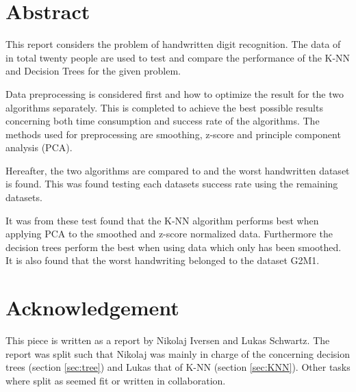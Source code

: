 \section*{Abstract}
This report considers the problem of handwritten digit recognition.
The data of in total twenty people are used to test and compare the performance of the K-NN and Decision Trees for the given problem.

Data preprocessing is considered first and how to optimize the result for the two algorithms separately.
This is completed to achieve the best possible results concerning both time consumption and success rate of the algorithms.
The methods used for preprocessing are smoothing, z-score and principle component analysis (PCA).

Hereafter, the two algorithms are compared to and the worst handwritten dataset is found.
This was found testing each datasets success rate using the remaining datasets.

It was from these test found that the K-NN algorithm performs best when applying PCA to the smoothed and z-score normalized data.
Furthermore the decision trees perform the best when using data which only has been smoothed.
It is also found that the worst handwriting belonged to the dataset G2M1.


\section*{Acknowledgement}
This piece is written as a report by Nikolaj Iversen and Lukas Schwartz.
The report was split such that Nikolaj was mainly in charge of the concerning decision trees (section \ref{sec:tree}) and Lukas that of K-NN (section \ref{sec:KNN}).
Other tasks where split as seemed fit or written in collaboration.
